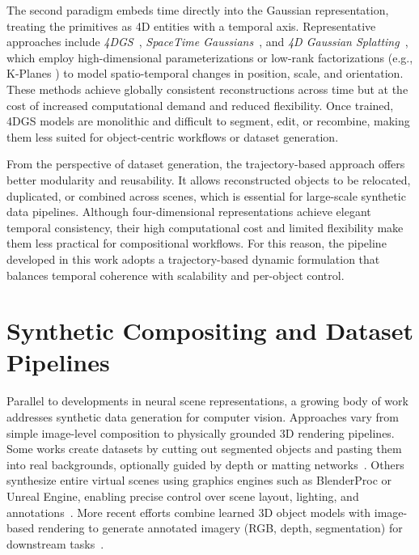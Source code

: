 The second paradigm embeds time directly into the Gaussian representation, treating the primitives as 4D entities with a temporal axis. 
Representative approaches include \textit{4DGS}~\cite{yang2023gs4d}, \textit{SpaceTime Gaussians}~\cite{lispacetimegaussianfeaturesplattingrealtime2024}, and \textit{4D Gaussian Splatting}~\cite{wu20244d}, which employ high-dimensional parameterizations or low-rank factorizations (e.g., K-Planes \cite{fridovich2023k}) to model spatio-temporal changes in position, scale, and orientation. 
These methods achieve globally consistent reconstructions across time but at the cost of increased computational demand and reduced flexibility. 
Once trained, 4DGS models are monolithic and difficult to segment, edit, or recombine, making them less suited for object-centric workflows or dataset generation.

From the perspective of dataset generation, the trajectory-based approach offers better modularity and reusability. It allows reconstructed objects to be relocated, duplicated, or combined across scenes, which is essential for large-scale synthetic data pipelines. Although four-dimensional representations achieve elegant temporal consistency, their high computational cost and limited flexibility make them less practical for compositional workflows. For this reason, the pipeline developed in this work adopts a trajectory-based dynamic formulation that balances temporal coherence with scalability and per-object control.

\section{Synthetic Compositing and Dataset Pipelines}

Parallel to developments in neural scene representations, a growing body of work addresses synthetic data generation for computer vision. 
Approaches vary from simple image-level composition to physically grounded 3D rendering pipelines. 
Some works create datasets by cutting out segmented objects and pasting them into real backgrounds, optionally guided by depth or matting networks~\cite{Dwibedi2017,Tobin2017,Liu2018,Li2023MattingSurvey}. 
Others synthesize entire virtual scenes using graphics engines such as BlenderProc or Unreal Engine, enabling precise control over scene layout, lighting, and annotations~\cite{Denninger2019,Lee2018}. 
More recent efforts combine learned 3D object models with image-based rendering to generate annotated imagery (RGB, depth, segmentation) for downstream tasks~\cite{Kirillov2023,Bertasius2020,Godard2019,Niu2021}.

